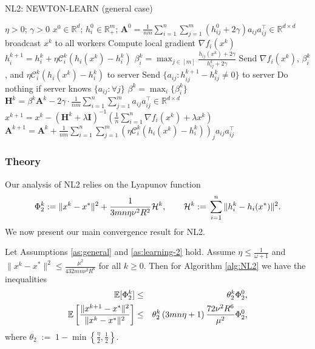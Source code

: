 \documentclass[10pt]{article}
\newcommand{\squeeze}{}
\newcommand{\eqdef}{\; { := }\;}
\newcommand{\R}{\mathbb{R}}
\newcommand{\newalpha}{h}
\newcommand{\mA}{\mathbf{A}}
\newcommand{\mH}{\mathbf{H}}
\newcommand{\mI}{\mathbf{I}}
\newcommand{\cC}{{\mathcal{C}}}
\begin{document}
\begin{algorithm}[tb]
	\caption{{\sf NL2: NEWTON-LEARN} (general case)}
	\label{alg:NL2}
\begin{algorithmic}
		 $\eta>0$; $\gamma>0$ 
		$x^0 \in \R^d$; $h^0_i \in \R^{m}_{+}$; $\mA^0 = \frac{1}{nm} \sum \limits_{i=1}^n \sum\limits_{j=1}^{m} (h_{ij}^0 + 2\gamma)a_{ij}a_{ij}^\top \in \R^{d\times d}$
		\STATE broadcast $x^k$ to all workers 
		\STATE  Compute local gradient $\nabla f_i(x^k)$ 
		\STATE $h^{k+1}_i = h^k_i + \eta \cC_i^k(\newalpha_i(x^k) - h^k_i)$ 
		\STATE $\beta_i^k = \max_{j\in [m]} \frac{\newalpha_{ij}(x^k) + 2\gamma}{h_{ij}^k + 2\gamma}$
		\STATE Send $\nabla f_i(x^k)$, $\beta_i^k$, and $\eta \cC_i^k(\newalpha_i(x^k) - h^k_i)$ to server 
		 Send $\{a_{ij} : h_{ij}^{k+1} - h_{ij}^k \neq 0\}$ to server
		 Do nothing if server knows $\{a_{ij} : \forall j\}$
		\ENDFOR
		\STATE $\beta^k = \max_{i} \{  \beta_i^k  \}$
		\STATE $\mH^k = \beta^k \mA^k - 2\gamma \cdot\frac{1}{nm} \sum \limits_{i=1}^n  \sum \limits_{j=1}^{m}a_{ij}a_{ij}^\top \in \R^{d\times d}$
		\STATE $x^{k+1} = x^k - \left( \mH^k + \lambda \mI \right)^{-1} \left(  \frac{1}{n} \sum \limits_{i=1}^n \nabla f_i(x^k) + \lambda x^k  \right)$
		\STATE $\mA^{k+1} = \mA^k + \frac{1}{nm} \sum \limits_{i=1}^n  \sum \limits_{j=1}^{m} (\eta \cC_i^k(\newalpha_i(x^k) - h^k_i))_j a_{ij}a_{ij}^\top $
		\ENDFOR
	\end{algorithmic}
\end{algorithm} 

\subsubsection{Theory}

Our analysis of {\sf NL2} relies on the  Lyapunov function 
$$\squeeze
\Phi_2^k \eqdef \|x^{k} - x^*\|^2 + \frac{1}{3mn\eta  \nu^2 R^2} {\cal H}^{k}, \qquad {\cal H}^k \eqdef  \sum_{i=1}^n \|h_i^k - \newalpha_i(x^*)\|^2.
$$
We now present our main convergence result for {\sf NL2}. 

\begin{theorem}[Convergence of {\sf NL2}]\label{th:general}
	Let Assumptions \ref{as:general} and \ref{as:learning-2} hold. Assume $\eta\leq \frac{1}{\omega+1}$ and $\|x^k - x^*\|^2 \leq \frac{\mu^2}{432mn \nu^2R^6}$ for all $k\geq 0$. Then for Algorithm \ref{alg:NL2} we have the inequalities 
\begin{eqnarray*}
\squeeze
	\mathbb{E}[\Phi_2^k] &\leq &  \theta_2^k \Phi_2^0 ,\notag\\ 
	\squeeze  \mathbb{E} \left[  \frac{\|x^{k+1} - x^*\|^2}{\|x^k - x^*\|^2 }  \right] 
		 &\leq & \theta_2^k  \left(  {3mn\eta} + 1  \right) \frac{72\nu^2 R^6}{\mu^2} \Phi_2^0, 
\end{eqnarray*}
where $\theta_2 \eqdef  1 - \min \left\{  \frac{\eta}{2}, \frac{1}{2}  \right\}  $.
\end{theorem}
\end{document}
